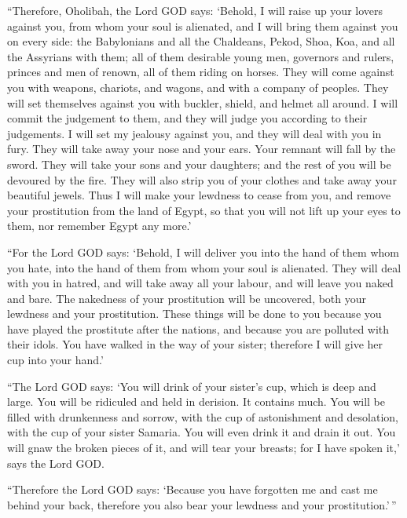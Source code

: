  ``Therefore, Oholibah, the Lord GOD says: `Behold, I will
raise up your lovers against you, from whom your soul is alienated, and
I will bring them against you on every side:  the
Babylonians and all the Chaldeans, Pekod, Shoa, Koa, and all the
Assyrians with them; all of them desirable young men, governors and
rulers, princes and men of renown, all of them riding on horses.
 They will come against you with weapons, chariots, and
wagons, and with a company of peoples. They will set themselves against
you with buckler, shield, and helmet all around. I will commit the
judgement to them, and they will judge you according to their
judgements.  I will set my jealousy against you, and they
will deal with you in fury. They will take away your nose and your ears.
Your remnant will fall by the sword. They will take your sons and your
daughters; and the rest of you will be devoured by the fire.
 They will also strip you of your clothes and take away
your beautiful jewels.  Thus I will make your lewdness to
cease from you, and remove your prostitution from the land of Egypt, so
that you will not lift up your eyes to them, nor remember Egypt any
more.'

 ``For the Lord GOD says: `Behold, I will deliver you into
the hand of them whom you hate, into the hand of them from whom your
soul is alienated.  They will deal with you in hatred, and
will take away all your labour, and will leave you naked and bare. The
nakedness of your prostitution will be uncovered, both your lewdness and
your prostitution.  These things will be done to you
because you have played the prostitute after the nations, and because
you are polluted with their idols.  You have walked in the
way of your sister; therefore I will give her cup into your hand.'

 ``The Lord GOD says: `You will drink of your sister's cup,
which is deep and large. You will be ridiculed and held in derision. It
contains much.  You will be filled with drunkenness and
sorrow, with the cup of astonishment and desolation, with the cup of
your sister Samaria.  You will even drink it and drain it
out. You will gnaw the broken pieces of it, and will tear your breasts;
for I have spoken it,' says the Lord GOD.

 ``Therefore the Lord GOD says: `Because you have forgotten
me and cast me behind your back, therefore you also bear your lewdness
and your prostitution.'\,''

